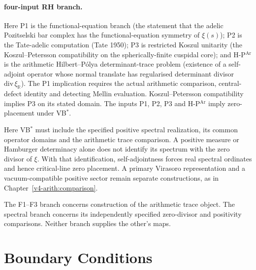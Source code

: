 \paragraph{four-input RH branch.}
Here P1 is the functional-equation branch (the statement that the
adelic Pozitsel\textquotesingle ski bar complex has the
functional-equation symmetry of \(\xi(s)\)); P2 is the
Tate-adelic computation (Tate 1950);
P3 is restricted Koszul unitarity (the Koszul--Petersson compatibility
on the spherically-finite cuspidal core); and H-P\(^{\mathrm{Ar}}\)
is the arithmetic Hilbert--P\'olya determinant-trace problem
(existence of a self-adjoint operator whose normal translate has
regularised determinant divisor \(\mathrm{div}\,\xi_{\mathbb R}\)).
The P1 implication requires the actual arithmetic comparison,
central-defect identity and detecting Mellin evaluation.
Koszul--Petersson compatibility implies P3 on its stated domain.
The inputs P1, P2, P3 and H-P\(^{\mathrm{Ar}}\) imply
zero-placement under VB\(^{*}\).

Here
VB\(^{*}\) must include the specified positive spectral realization,
its common operator domains and the arithmetic trace comparison.
A positive measure or Hamburger determinacy alone does not identify
its spectrum with the zero divisor of \(\xi\). With that identification,
self-adjointness forces real spectral ordinates and hence critical-line
zero placement. A primary Virasoro representation and a vacuum-compatible
positive sector remain separate constructions, as in
Chapter~\ref{v4-arith:comparison}.

The F1--F3 branch concerns construction of the arithmetic trace object.
The spectral branch concerns its independently specified zero-divisor
and positivity comparisons. Neither branch supplies the other's maps.

\section{Boundary Conditions}
\label{v4-arith:app:C:residual-list}

